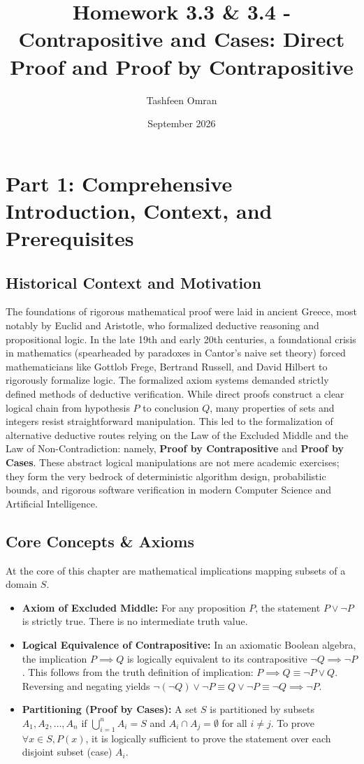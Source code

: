 \documentclass[11pt]{article}
\title{\textbf{Homework 3.3 \& 3.4 - Contrapositive and Cases: Direct Proof and Proof by Contrapositive}}
\author{Tashfeen Omran}
\date{September 2026}
\begin{document}
\maketitle
\tableofcontents
\newpage

\section{Part 1: Comprehensive Introduction, Context, and Prerequisites}

\subsection{Historical Context and Motivation}
The foundations of rigorous mathematical proof were laid in ancient Greece, most notably by Euclid and Aristotle, who formalized deductive reasoning and propositional logic. In the late 19th and early 20th centuries, a foundational crisis in mathematics (spearheaded by paradoxes in Cantor's naive set theory) forced mathematicians like Gottlob Frege, Bertrand Russell, and David Hilbert to rigorously formalize logic. The formalized axiom systems demanded strictly defined methods of deductive verification. While direct proofs construct a clear logical chain from hypothesis $P$ to conclusion $Q$, many properties of sets and integers resist straightforward manipulation. This led to the formalization of alternative deductive routes relying on the Law of the Excluded Middle and the Law of Non-Contradiction: namely, \textbf{Proof by Contrapositive} and \textbf{Proof by Cases}. These abstract logical manipulations are not mere academic exercises; they form the very bedrock of deterministic algorithm design, probabilistic bounds, and rigorous software verification in modern Computer Science and Artificial Intelligence.

\subsection{Core Concepts \& Axioms}
At the core of this chapter are mathematical implications mapping subsets of a domain $S$. 
\begin{itemize}
    \item \textbf{Axiom of Excluded Middle:} For any proposition $P$, the statement $P \lor \neg P$ is strictly true. There is no intermediate truth value.
    \item \textbf{Logical Equivalence of Contrapositive:} In an axiomatic Boolean algebra, the implication $P \implies Q$ is logically equivalent to its contrapositive $\neg Q \implies \neg P$. This follows from the truth definition of implication: $P \implies Q \equiv \neg P \lor Q$. Reversing and negating yields $\neg(\neg Q) \lor \neg P \equiv Q \lor \neg P \equiv \neg Q \implies \neg P$.
    \item \textbf{Partitioning (Proof by Cases):} A set $S$ is partitioned by subsets $A_1, A_2, \dots, A_n$ if $\bigcup_{i=1}^n A_i = S$ and $A_i \cap A_j = \emptyset$ for all $i \neq j$. To prove $\forall x \in S, P(x)$, it is logically sufficient to prove the statement over each disjoint subset (case) $A_i$.
\end{itemize}
\end{document}
